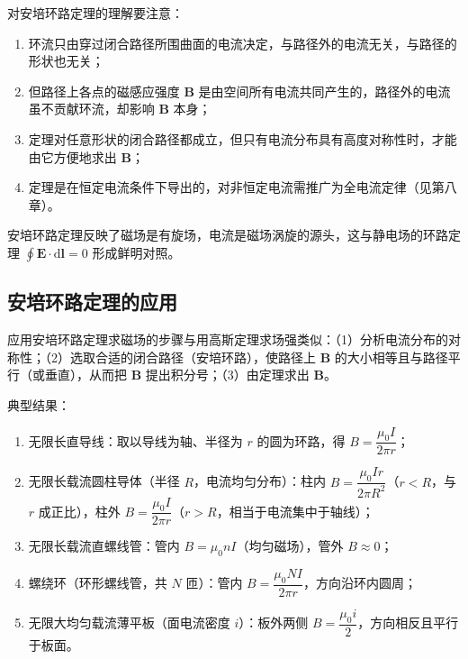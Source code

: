     对安培环路定理的理解要注意：
    \begin{enumerate}
        \item 环流只由穿过闭合路径所围曲面的电流决定，与路径外的电流无关，与路径的形状也无关；
        \item 但路径上各点的磁感应强度 $\boldsymbol{B}$ 是由空间所有电流共同产生的，路径外的电流虽不贡献环流，却影响 $\boldsymbol{B}$ 本身；
        \item 定理对任意形状的闭合路径都成立，但只有电流分布具有高度对称性时，才能由它方便地求出 $\boldsymbol{B}$；
        \item 定理是在恒定电流条件下导出的，对非恒定电流需推广为全电流定律（见第八章）。
    \end{enumerate}
    安培环路定理反映了磁场是有旋场，电流是磁场涡旋的源头，这与静电场的环路定理 $\oint\boldsymbol{E}\cdot\mathrm{d}\boldsymbol{l}=0$ 形成鲜明对照。

    \subsection{安培环路定理的应用}
    应用安培环路定理求磁场的步骤与用高斯定理求场强类似：（1）分析电流分布的对称性；（2）选取合适的闭合路径（安培环路），使路径上 $\boldsymbol{B}$ 的大小相等且与路径平行（或垂直），从而把 $\boldsymbol{B}$ 提出积分号；（3）由定理求出 $\boldsymbol{B}$。

    典型结果：
    \begin{enumerate}
        \item 无限长直导线：取以导线为轴、半径为 $r$ 的圆为环路，得 $B=\dfrac{\mu_0I}{2\pi r}$；
        \item 无限长载流圆柱导体（半径 $R$，电流均匀分布）：柱内 $B=\dfrac{\mu_0Ir}{2\pi R^{2}}$（$r<R$，与 $r$ 成正比），柱外 $B=\dfrac{\mu_0I}{2\pi r}$（$r>R$，相当于电流集中于轴线）；
        \item 无限长载流直螺线管：管内 $B=\mu_0nI$（均匀磁场），管外 $B\approx0$；
        \item 螺绕环（环形螺线管，共 $N$ 匝）：管内 $B=\dfrac{\mu_0NI}{2\pi r}$，方向沿环内圆周；
        \item 无限大均匀载流薄平板（面电流密度 $i$）：板外两侧 $B=\dfrac{\mu_0i}{2}$，方向相反且平行于板面。
    \end{enumerate}


